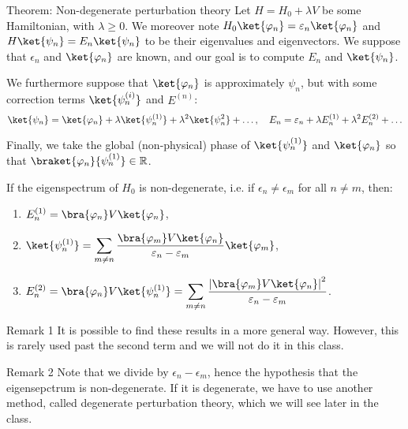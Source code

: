 \documentclass[a4paper]{article}
\begin{document}
\begin{parag}{Theorem: Non-degenerate perturbation theory}
    Let $H = H_0 + \lambda V$ be some Hamiltonian, with $\lambda \geq 0$. We moreover note $H_0 \ket{\phi_n} = \epsilon_n \ket{\phi_n}$ and $H \ket{\psi_n} = E_n \ket{\psi_n}$ to be their eigenvalues and eigenvectors. We suppose that $\epsilon_n$ and $\ket{\phi_n}$ are known, and our goal is to compute $E_n$ and $\ket{\psi_n}$.

    We furthermore suppose that $\ket{\phi_n}$ is approximately $\psi_n$, but with some correction terms $\ket{\psi_n^{\left(i\right)}}$ and $E^{\left(n\right)}$:
    \[\ket{\psi_n} =  \ket{\phi_n} + \lambda \ket{\psi_n^{\left(1\right)}} + \lambda^2 \ket{\psi_n^2} + \ldots, \mathspace E_n = \epsilon_n + \lambda E_n^{\left(1\right)} + \lambda^2 E_n^{\left(2\right)} + \ldots\]

    Finally, we take the global (non-physical) phase of $\ket{\psi_n^{\left(1\right)}}$ and $\ket{\phi_n}$ so that $\braket{\phi_n}{\psi_n^{\left(1\right)}} \in \mathbb{R}$.

    If the eigenspectrum of $H_0$ is non-degenerate, i.e. if $\epsilon_n \neq \epsilon_m$ for all $n \neq m$, then:
    \begin{enumerate}
        \item $\displaystyle E_n^{\left(1\right)} = \bra{\phi_n}V \ket{\phi_n}$, 
        \item $\displaystyle \ket{\psi_n^{\left(1\right)}} = \sum_{m \neq n} \frac{\bra{\phi_m} V \ket{\phi_n}}{\epsilon_n - \epsilon_m} \ket{\phi_m}$,
        \item $\displaystyle E_n^{\left(2\right)} = \bra{\phi_n} V \ket{\psi_n^{\left(1\right)}} = \sum_{m \neq n} \frac{\left|\bra{\phi_m} V \ket{\phi_n}\right|^2}{\epsilon_n - \epsilon_m}$.
    \end{enumerate}

    \begin{subparag}{Remark 1}
        It is possible to find these results in a more general way. However, this is rarely used past the second term and we will not do it in this class.
    \end{subparag}
    
    \begin{subparag}{Remark 2}
        Note that we divide by $\epsilon_n - \epsilon_m$, hence the hypothesis that the eigensepctrum is non-degenerate. If it is degenerate, we have to use another method, called degenerate perturbation theory, which we will see later in the class.
    \end{subparag}


\end{parag}
\end{document}
